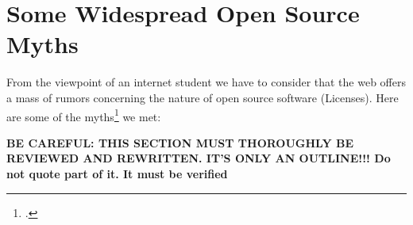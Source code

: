 %
%
%
%

%




\section{Some Widespread Open Source Myths}

From the viewpoint of an internet student we have to consider that the web
offers a mass of rumors concerning the nature of open source software
(Licenses). Here are some of the myths\footcite[At least one time even a
scientific legally discussing book is talking about the \enquote{myth around open
source licenses} - although only as part of  the title: cf][1ff,
especially 209ff]{GuiOvd2006a} we met:
 
\bfseries{BE CAREFUL: THIS SECTION MUST THOROUGHLY BE REVIEWED AND REWRITTEN. 
IT'S ONLY AN OUTLINE!!! Do not quote part of it. It must be verified} 

